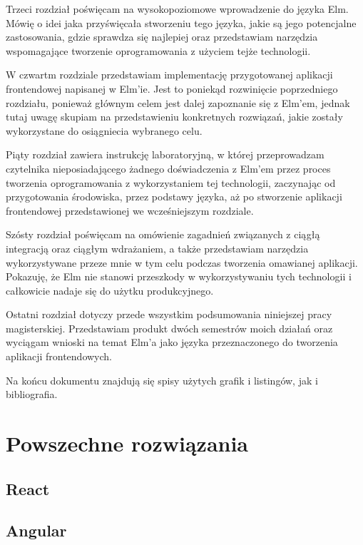 \documentclass[twoside,a4paper]{report}
\begin{document}
Trzeci rozdział poświęcam na wysokopoziomowe wprowadzenie do języka Elm.
Mówię o idei jaka przyświęcała stworzeniu tego języka, jakie są jego potencjalne zastosowania, gdzie sprawdza się najlepiej oraz przedstawiam narzędzia wspomagające tworzenie oprogramowania z użyciem tejże technologii.

W czwartm rozdziale przedstawiam implementację przygotowanej aplikacji frontendowej napisanej w Elm'ie.
Jest to poniekąd rozwinięcie poprzedniego rozdziału, ponieważ głównym celem jest dalej zapoznanie się z Elm'em, jednak tutaj uwagę skupiam na przedstawieniu konkretnych rozwiązań, jakie zostały wykorzystane do osiągniecia wybranego celu.

Piąty rozdział zawiera instrukcję laboratoryjną, w której przeprowadzam czytelnika nieposiadającego żadnego doświadczenia z Elm'em przez proces tworzenia oprogramowania z wykorzystaniem tej technologii, zaczynając od przygotowania środowiska, przez podstawy języka, aż po stworzenie aplikacji frontendowej przedstawionej we wcześniejszym rozdziale.

Szósty rozdział poświęcam na omówienie zagadnień związanych z ciągłą integracją oraz ciągłym wdrażaniem, a także przedstawiam narzędzia wykorzystywane przeze mnie w tym celu podczas tworzenia omawianej aplikacji.
Pokazuję, że Elm nie stanowi przeszkody w wykorzystywaniu tych technologii i całkowicie nadaje się do użytku produkcyjnego.

Ostatni rozdział dotyczy przede wszystkim podsumowania niniejszej pracy magisterskiej.
Przedstawiam produkt dwóch semestrów moich działań oraz wyciągam wnioski na temat Elm'a jako języka przeznaczonego do tworzenia aplikacji frontendowych.

Na końcu dokumentu znajdują się spisy użytych grafik i listingów, jak i bibliografia.


\chapter{Powszechne rozwiązania}

\section{React}
\cite{react}
\cite{reactdocs}
\section{Angular}
\cite{angularjs}
\cite{angulardocs}
\end{document}

